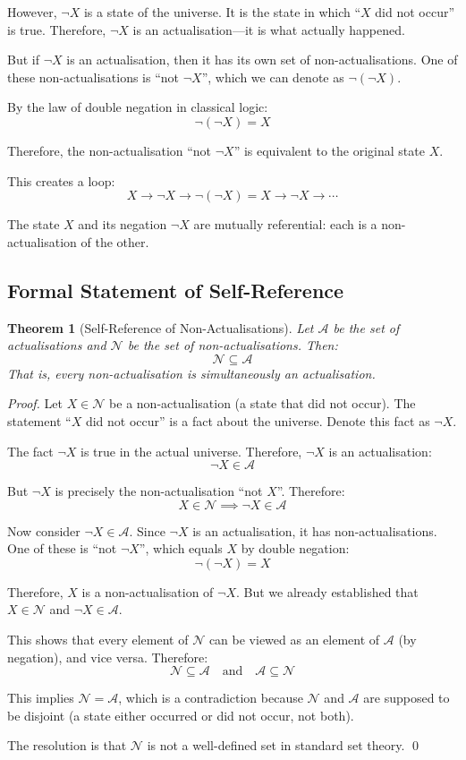 \documentclass[twocolumn,10pt]{article}
\newtheorem{theorem}{Theorem}[section]
\theoremstyle{definition}
\theoremstyle{remark}
\begin{document}
However, $\neg X$ is a state of the universe. It is the state in which ``$X$ did not occur'' is true. Therefore, $\neg X$ is an actualisation—it is what actually happened.

But if $\neg X$ is an actualisation, then it has its own set of non-actualisations. One of these non-actualisations is ``not $\neg X$'', which we can denote as $\neg(\neg X)$.

By the law of double negation in classical logic:
$$
\neg(\neg X) = X
$$

Therefore, the non-actualisation ``not $\neg X$'' is equivalent to the original state $X$.

This creates a loop:
$$
X \to \neg X \to \neg(\neg X) = X \to \neg X \to \cdots
$$

The state $X$ and its negation $\neg X$ are mutually referential: each is a non-actualisation of the other.

\subsection{Formal Statement of Self-Reference}

\begin{theorem}[Self-Reference of Non-Actualisations]
Let $\mathcal{A}$ be the set of actualisations and $\mathcal{N}$ be the set of non-actualisations. Then:
$$
\mathcal{N} \subseteq \mathcal{A}
$$
That is, every non-actualisation is simultaneously an actualisation.
\end{theorem}

\begin{proof}
Let $X \in \mathcal{N}$ be a non-actualisation (a state that did not occur). The statement ``$X$ did not occur'' is a fact about the universe. Denote this fact as $\neg X$.

The fact $\neg X$ is true in the actual universe. Therefore, $\neg X$ is an actualisation:
$$
\neg X \in \mathcal{A}
$$

But $\neg X$ is precisely the non-actualisation ``not $X$''. Therefore:
$$
X \in \mathcal{N} \implies \neg X \in \mathcal{A}
$$

Now consider $\neg X \in \mathcal{A}$. Since $\neg X$ is an actualisation, it has non-actualisations. One of these is ``not $\neg X$'', which equals $X$ by double negation:
$$
\neg(\neg X) = X
$$

Therefore, $X$ is a non-actualisation of $\neg X$. But we already established that $X \in \mathcal{N}$ and $\neg X \in \mathcal{A}$.

This shows that every element of $\mathcal{N}$ can be viewed as an element of $\mathcal{A}$ (by negation), and vice versa. Therefore:
$$
\mathcal{N} \subseteq \mathcal{A} \quad \text{and} \quad \mathcal{A} \subseteq \mathcal{N}
$$

This implies $\mathcal{N} = \mathcal{A}$, which is a contradiction because $\mathcal{N}$ and $\mathcal{A}$ are supposed to be disjoint (a state either occurred or did not occur, not both).

The resolution is that $\mathcal{N}$ is not a well-defined set in standard set theory. \qed
\end{proof}
\end{document}

